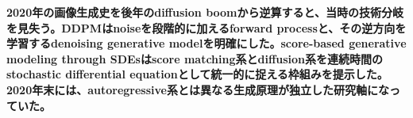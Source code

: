 \noindent\textbf{2020年の画像生成史を後年のdiffusion boomから逆算すると、当時の技術分岐を見失う。DDPMはnoiseを段階的に加えるforward processと、その逆方向を学習するdenoising generative modelを明確にした。score-based generative modeling through SDEsはscore matching系とdiffusion系を連続時間のstochastic differential equationとして統一的に捉える枠組みを提示した。2020年末には、autoregressive系とは異なる生成原理が独立した研究軸になっていた。}\autocite{src-c012a248ff78,src-d6e451e5085e}
